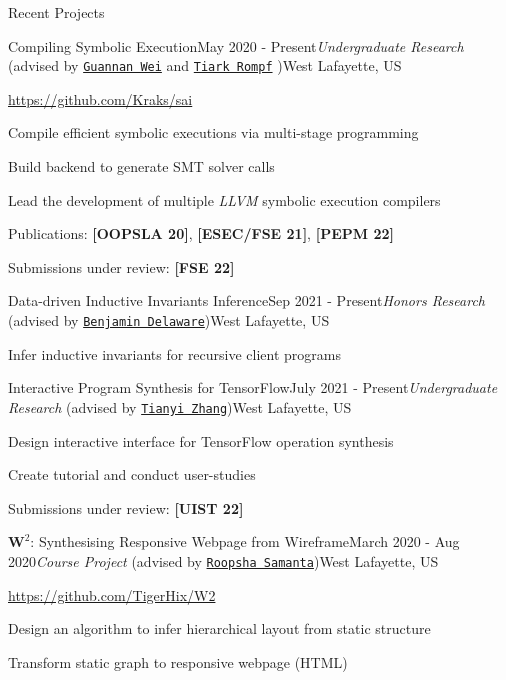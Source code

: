 \documentclass{resume} %
\begin{document}
\begin{rSection}{Recent Projects}

\begin{rSubsection}{Compiling Symbolic Execution}{May 2020 - Present}{\textit{Undergraduate Research} (advised by \href{http://continuation.passing.style/}{\texttt{Guannan Wei}} and \href{http://tiarkrompf.github.io/}{\texttt{Tiark Rompf}} )}{West Lafayette, US}
\item \url{https://github.com/Kraks/sai}
\item Compile efficient symbolic executions via multi-stage programming
\item Build backend to generate SMT solver calls
\item Lead the development of multiple \textit{LLVM} symbolic execution compilers
\item Publications: \textbf{[OOPSLA 20]}, \textbf{[ESEC/FSE 21]}, \textbf{[PEPM 22]}
\item Submissions under review: \textbf{[FSE 22]}
\end{rSubsection}

\begin{rSubsection}{Data-driven Inductive Invariants Inference}{Sep 2021 - Present}{\textit{Honors Research} (advised by \href{https://www.cs.purdue.edu/homes/bendy/}{\texttt{Benjamin Delaware}})}{West Lafayette, US}
    \item Infer inductive invariants for recursive client programs
\end{rSubsection}

\begin{rSubsection}{Interactive Program Synthesis for TensorFlow}{July 2021 - Present}{\textit{Undergraduate Research} (advised by \href{https://tianyi-zhang.github.io/}{\texttt{Tianyi Zhang}})}{West Lafayette, US}
    \item Design interactive interface for TensorFlow operation synthesis
    \item Create tutorial and conduct user-studies
\item Submissions under review: \textbf{[UIST 22]}
\end{rSubsection}

\begin{rSubsection}{$\mathbf{W}^2$: Synthesising Responsive Webpage from Wireframe}{March 2020 - Aug 2020}{\textit{Course Project} (advised by \href{https://www.cs.purdue.edu/homes/roopsha/}{\texttt{Roopsha Samanta}})}{West Lafayette, US}
\item \url{https://github.com/TigerHix/W2}
\item Design an algorithm to infer hierarchical layout from static structure
\item Transform static graph to responsive webpage (HTML)
\end{rSubsection}


\end{rSection}
\end{document}

